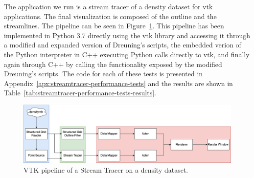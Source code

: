 The application we run is a stream tracer of a density dataset for \acrshort{vtk} applications. The final visualization is composed of the outline and the streamlines. The pipeline can be seen in Figure~\ref{fig:streamtracer_pipeline}. This pipeline has been implemented in Python 3.7 directly using the \acrshort{vtk} library and accessing it through a modified and expanded version of Dreuning's scripts, the embedded verion of the Python interpreter in C++ executing Python calls directly to \acrshort{vtk}, and finally again through C++ by calling the functionality exposed by the modified Dreuning's scripts. The code for each of these tests is presented in Appendix~\ref{apx:streamtracer-performance-tests} and the results are shown in Table~\ref{tab:streamtracer-performance-tests-results}.

\begin{figure}[t]
    \centering
    \includegraphics[width=\textwidth]{pictures/streamtracer_pipeline.png}
    \caption{VTK pipeline of a Stream Tracer on a density dataset.}
    \label{fig:streamtracer_pipeline}
\end{figure}


